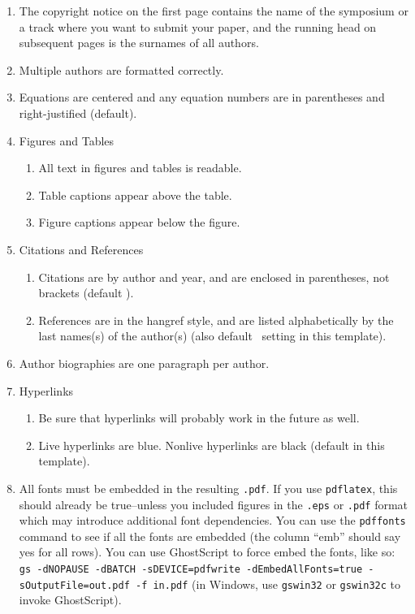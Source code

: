 \documentclass{scspaperproc}
\theoremstyle{scsthe}
\begin{document}
\begin{enumerate}
	\item The copyright notice on the first page contains the name of the symposium or a track where you want to submit your paper, and the running head on subsequent pages is the surnames of all authors.
	\item Multiple authors are formatted correctly.
	\item Equations are centered and any equation numbers are in parentheses and right-justified (default).
	\item Figures and Tables
  \begin{enumerate}
	  \item All text in figures and tables is readable.
	  \item Table captions appear above the table.
	  \item Figure captions appear below the figure.
	\end{enumerate}
	\item Citations and References
  \begin{enumerate}
	  \item Citations are by author and year, and are enclosed in parentheses, not brackets (default \BibTeX). 
	  \item References are in the hangref style, and are listed alphabetically by the last names(s) of the author(s) (also default \BibTeX\ setting in this template). 
	\end{enumerate}
	\item Author biographies are one paragraph per author.
	\item Hyperlinks
  \begin{enumerate}
	  \item Be sure that hyperlinks will probably work in the future as well.
	  \item Live hyperlinks are blue. Nonlive hyperlinks are black (default in this template).
	\end{enumerate}
	\item All fonts must be embedded in the resulting \texttt{.pdf}. If you use \texttt{pdflatex}, this should already be true--unless you included figures in the \texttt{.eps} or \texttt{.pdf} format which may introduce additional font dependencies. You can use the \texttt{pdffonts} command to see if all the fonts are embedded (the column ``emb'' should say yes for all rows). You can use GhostScript to force embed the fonts, like so: {\texttt{gs -dNOPAUSE -dBATCH -sDEVICE=pdfwrite -dEmbedAllFonts=true -sOutputFile=out.pdf -f in.pdf}} (in Windows, use \texttt{gswin32} or \texttt{gswin32c} to invoke GhostScript).
\end{enumerate}
\end{document}
